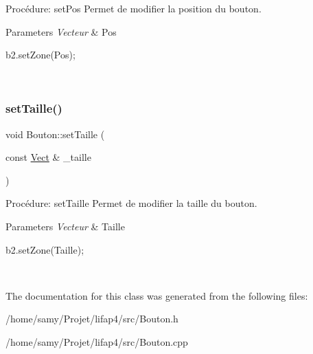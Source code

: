 Procédure\+: set\+Pos Permet de modifier la position du bouton. 


\begin{DoxyParams}{Parameters}
{\em Vecteur} & Pos 
\begin{DoxyCode}
b2.setZone(Pos);
\end{DoxyCode}
 \\
\hline
\end{DoxyParams}
\mbox{\label{classBouton_a972600e88d0a65431c27bec898fbba36}} 
\subsubsection{\texorpdfstring{set\+Taille()}{setTaille()}}
{\footnotesize\ttfamily void Bouton\+::set\+Taille (\begin{DoxyParamCaption}\item[{const \hyperlink{classVect}{Vect} \&}]{\+\_\+taille }\end{DoxyParamCaption})}



Procédure\+: set\+Taille Permet de modifier la taille du bouton. 


\begin{DoxyParams}{Parameters}
{\em Vecteur} & Taille 
\begin{DoxyCode}
b2.setZone(Taille);
\end{DoxyCode}
 \\
\hline
\end{DoxyParams}


The documentation for this class was generated from the following files\+:\begin{DoxyCompactItemize}
\item 
/home/samy/\+Projet/lifap4/src/Bouton.\+h\item 
/home/samy/\+Projet/lifap4/src/Bouton.\+cpp\end{DoxyCompactItemize}
